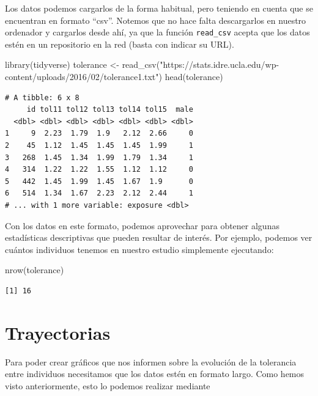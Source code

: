 \documentclass[
]{book}
\newenvironment{Shaded}{\begin{snugshade}}{\end{snugshade}}
\newcommand{\FunctionTok}[1]{\textcolor[rgb]{0.00,0.00,0.00}{#1}}
\newcommand{\NormalTok}[1]{#1}
\newcommand{\OtherTok}[1]{\textcolor[rgb]{0.56,0.35,0.01}{#1}}
\newcommand{\StringTok}[1]{\textcolor[rgb]{0.31,0.60,0.02}{#1}}
\begin{document}
Los datos podemos cargarlos de la forma habitual, pero teniendo en cuenta que se encuentran en formato ``csv''. Notemos que no hace falta descargarlos en nuestro ordenador y cargarlos desde ahí, ya que la función \texttt{read\_csv} acepta que los datos estén en un repositorio en la red (basta con indicar su URL).

\begin{Shaded}
\begin{Highlighting}[]
\FunctionTok{library}\NormalTok{(tidyverse)}
\NormalTok{tolerance }\OtherTok{\textless{}{-}} \FunctionTok{read\_csv}\NormalTok{(}\StringTok{"https://stats.idre.ucla.edu/wp{-}content/uploads/2016/02/tolerance1.txt"}\NormalTok{)}
\FunctionTok{head}\NormalTok{(tolerance)}
\end{Highlighting}
\end{Shaded}

\begin{verbatim}
# A tibble: 6 x 8
     id tol11 tol12 tol13 tol14 tol15  male
  <dbl> <dbl> <dbl> <dbl> <dbl> <dbl> <dbl>
1     9  2.23  1.79  1.9   2.12  2.66     0
2    45  1.12  1.45  1.45  1.45  1.99     1
3   268  1.45  1.34  1.99  1.79  1.34     1
4   314  1.22  1.22  1.55  1.12  1.12     0
5   442  1.45  1.99  1.45  1.67  1.9      0
6   514  1.34  1.67  2.23  2.12  2.44     1
# ... with 1 more variable: exposure <dbl>
\end{verbatim}

Con los datos en este formato, podemos aprovechar para obtener algunas estadísticas descriptivas que pueden resultar de interés. Por ejemplo, podemos ver cuántos individuos tenemos en nuestro estudio simplemente ejecutando:

\begin{Shaded}
\begin{Highlighting}[]
\FunctionTok{nrow}\NormalTok{(tolerance)}
\end{Highlighting}
\end{Shaded}

\begin{verbatim}
[1] 16
\end{verbatim}

\hypertarget{trayectorias}{%
\section{Trayectorias}\label{trayectorias}}

Para poder crear gráficos que nos informen sobre la evolución de la tolerancia entre individuos necesitamos que los datos estén en formato largo. Como hemos visto anteriormente, esto lo podemos realizar mediante
\end{document}
